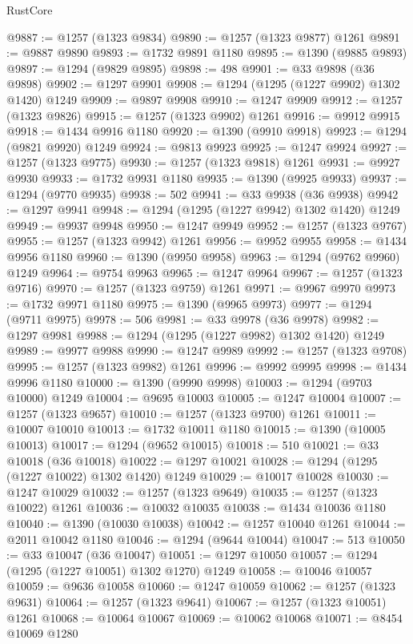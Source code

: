 \begin{lexlean}{RustCore}
\begin{coremodule}
@9887 := @1257 (@1323 @9834)
@9890 := @1257 (@1323 @9877) @1261
@9891 := @9887 @9890
@9893 := @1732 @9891 @1180
@9895 := @1390 (@9885 @9893)
@9897 := @1294 (@9829 @9895)
@9898 := 498
@9901 := @33 @9898 (@36 @9898)
@9902 := @1297 @9901
@9908 := @1294 (@1295 (@1227 @9902) @1302 @1420) @1249
@9909 := @9897 @9908
@9910 := @1247 @9909
@9912 := @1257 (@1323 @9826)
@9915 := @1257 (@1323 @9902) @1261
@9916 := @9912 @9915
@9918 := @1434 @9916 @1180
@9920 := @1390 (@9910 @9918)
@9923 := @1294 (@9821 @9920) @1249
@9924 := @9813 @9923
@9925 := @1247 @9924
@9927 := @1257 (@1323 @9775)
@9930 := @1257 (@1323 @9818) @1261
@9931 := @9927 @9930
@9933 := @1732 @9931 @1180
@9935 := @1390 (@9925 @9933)
@9937 := @1294 (@9770 @9935)
@9938 := 502
@9941 := @33 @9938 (@36 @9938)
@9942 := @1297 @9941
@9948 := @1294 (@1295 (@1227 @9942) @1302 @1420) @1249
@9949 := @9937 @9948
@9950 := @1247 @9949
@9952 := @1257 (@1323 @9767)
@9955 := @1257 (@1323 @9942) @1261
@9956 := @9952 @9955
@9958 := @1434 @9956 @1180
@9960 := @1390 (@9950 @9958)
@9963 := @1294 (@9762 @9960) @1249
@9964 := @9754 @9963
@9965 := @1247 @9964
@9967 := @1257 (@1323 @9716)
@9970 := @1257 (@1323 @9759) @1261
@9971 := @9967 @9970
@9973 := @1732 @9971 @1180
@9975 := @1390 (@9965 @9973)
@9977 := @1294 (@9711 @9975)
@9978 := 506
@9981 := @33 @9978 (@36 @9978)
@9982 := @1297 @9981
@9988 := @1294 (@1295 (@1227 @9982) @1302 @1420) @1249
@9989 := @9977 @9988
@9990 := @1247 @9989
@9992 := @1257 (@1323 @9708)
@9995 := @1257 (@1323 @9982) @1261
@9996 := @9992 @9995
@9998 := @1434 @9996 @1180
@10000 := @1390 (@9990 @9998)
@10003 := @1294 (@9703 @10000) @1249
@10004 := @9695 @10003
@10005 := @1247 @10004
@10007 := @1257 (@1323 @9657)
@10010 := @1257 (@1323 @9700) @1261
@10011 := @10007 @10010
@10013 := @1732 @10011 @1180
@10015 := @1390 (@10005 @10013)
@10017 := @1294 (@9652 @10015)
@10018 := 510
@10021 := @33 @10018 (@36 @10018)
@10022 := @1297 @10021
@10028 := @1294 (@1295 (@1227 @10022) @1302 @1420) @1249
@10029 := @10017 @10028
@10030 := @1247 @10029
@10032 := @1257 (@1323 @9649)
@10035 := @1257 (@1323 @10022) @1261
@10036 := @10032 @10035
@10038 := @1434 @10036 @1180
@10040 := @1390 (@10030 @10038)
@10042 := @1257 @10040 @1261
@10044 := @2011 @10042 @1180
@10046 := @1294 (@9644 @10044)
@10047 := 513
@10050 := @33 @10047 (@36 @10047)
@10051 := @1297 @10050
@10057 := @1294 (@1295 (@1227 @10051) @1302 @1270) @1249
@10058 := @10046 @10057
@10059 := @9636 @10058
@10060 := @1247 @10059
@10062 := @1257 (@1323 @9631)
@10064 := @1257 (@1323 @9641)
@10067 := @1257 (@1323 @10051) @1261
@10068 := @10064 @10067
@10069 := @10062 @10068
@10071 := @8454 @10069 @1280

\end{coremodule}
\end{lexlean}
